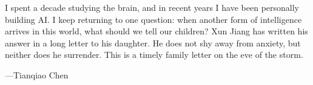 

\begin{myquote}
I spent a decade studying the brain, and in recent years I have been personally building AI. I keep returning to one question: when another form of intelligence arrives in this world, what should we tell our children? Xun Jiang has written his answer in a long letter to his daughter. He does not shy away from anxiety, but neither does he surrender. This is a timely family letter on the eve of the storm.


\hfill ---Tianqiao Chen

\end{myquote}
